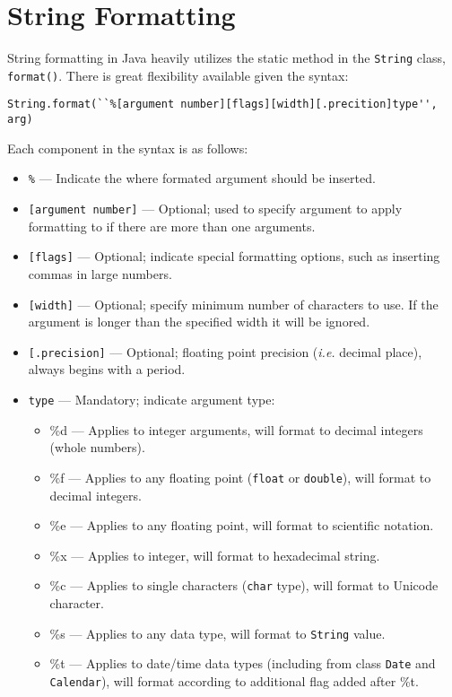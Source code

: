 \documentclass{tufte-handout}
\begin{document}
    \section*{String Formatting}
    String formatting in Java heavily utilizes the static method in the \texttt{String} class, \texttt{format()}. There is great flexibility available given the syntax:

    \begin{lstlisting}
String.format(``%[argument number][flags][width][.precition]type'', arg)
    \end{lstlisting}

    Each component in the syntax is as follows:

    \begin{itemize}
        \item \texttt{\%} --- Indicate the where formated argument should be inserted.
        \item \texttt{[argument number]} --- Optional; used to specify argument to apply formatting to if there are more than one arguments.
        \item \texttt{[flags]} --- Optional; indicate special formatting options, such as inserting commas in large numbers.
        \item \texttt{[width]} --- Optional; specify minimum number of characters to use. If the argument is longer than the specified width it will be ignored.
        \item \texttt{[.precision]} --- Optional; floating point precision (\textit{i.e.} decimal place), always begins with a period.
        \item \texttt{type} --- Mandatory; indicate argument type:
        \begin{itemize}
            \item \%d --- Applies to integer arguments, will format to decimal integers (whole numbers).
            \item \%f --- Applies to any floating point (\texttt{float} or \texttt{double}), will format to decimal integers.
            \item \%e --- Applies to any floating point, will format to scientific notation.
            \item \%x --- Applies to integer, will format to hexadecimal string.
            \item \%c --- Applies to single characters (\texttt{char} type), will format to Unicode character.
            \item \%s --- Applies to any data type, will format to \texttt{String} value.
            \item \%t --- Applies to date/time data types (including from class \texttt{Date} and \texttt{Calendar}), will format according to additional flag added after \%t.
        \end{itemize}
    \end{itemize}
\end{document}
